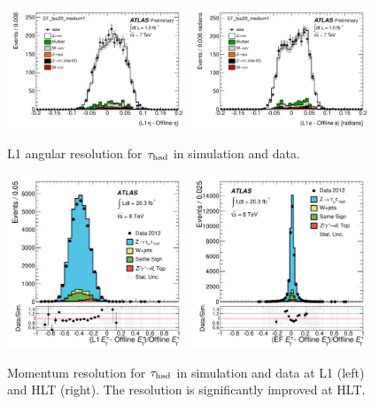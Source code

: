 \begin{figure}[!htpb]
  \centering
  \includegraphics[width=0.48\textwidth]{figures/ATL-COM-DAQ-2012-001/c_L1_etares}
  \includegraphics[width=0.48\textwidth]{figures/ATL-COM-DAQ-2012-001/c_L1_phires}
  \caption{L1 angular resolution for $\tau_\text{had}$ in simulation and data.}
  \label{fig:prospects-trigger-2011-angular}
\end{figure}

\begin{figure}[!htpb]
  \centering
  \includegraphics[width=0.48\textwidth]{figures/PERF-2013-06/fig_18a}
  \includegraphics[width=0.48\textwidth]{figures/PERF-2013-06/fig_18c}
  \caption{Momentum resolution for $\tau_\text{had}$ in simulation and data at L1 (left) and HLT (right). The resolution is significantly improved at HLT.}
  \label{fig:prospects-trigger-resolution}
\end{figure}

